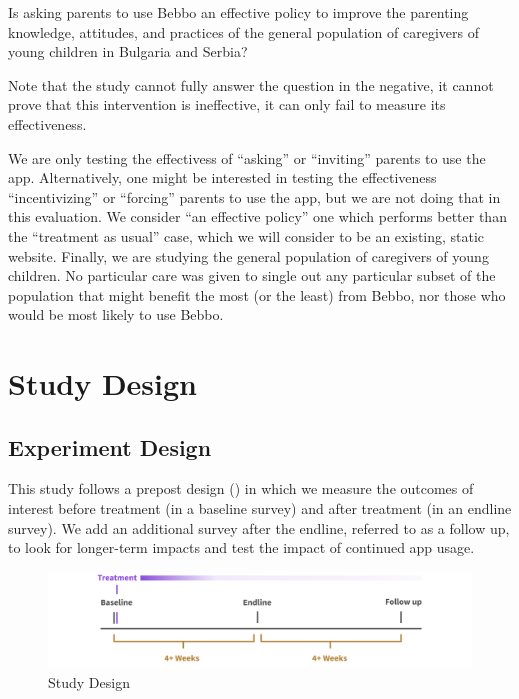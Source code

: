 \documentclass{article}
\begin{document}
\begin{displayquote}
Is asking parents to use Bebbo an effective policy to improve the parenting knowledge, attitudes, and practices of the general population of caregivers of young children in Bulgaria and Serbia?
\end{displayquote}

\noindent Note that the study cannot fully answer the question in the negative, it cannot prove that this intervention is ineffective, it can only fail to measure its effectiveness.

We are only testing the effectivess of ``asking'' or ``inviting'' parents to use the app. Alternatively, one might be interested in testing the effectiveness ``incentivizing'' or ``forcing'' parents to use the app, but we are not doing that in this evaluation. We consider ``an effective policy'' one which performs better than the ``treatment as usual'' case, which we will consider to be an existing, static website. Finally, we are studying the general population of caregivers of young children. No particular care was given to single out any particular subset of the population that might benefit the most (or the least) from Bebbo, nor those who would be most likely to use Bebbo.


\section{Study Design}

\subsection*{Experiment Design}

This study follows a prepost design (\cite{Clifford2021}) in which we measure the outcomes of interest before treatment (in a baseline survey) and after treatment (in an endline survey). We add an additional survey after the endline, referred to as a follow up, to look for longer-term impacts and test the impact of continued app usage.


\begin{figure}[H]
\includegraphics[width=\textwidth]{images/design-timeline.png}
\caption{Study Design}
\label{fig:Study Design}
\end{figure}
\end{document}
